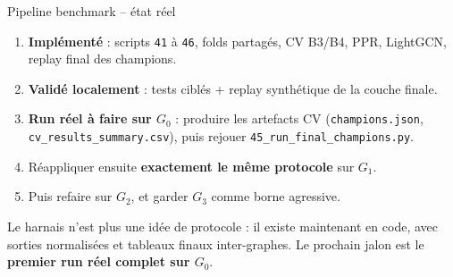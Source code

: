 \documentclass[aspectratio=169,10pt]{beamer}
\newcommand{\okbox}[1]{%
  \begin{center}
  \colorbox{green!10}{\parbox{0.92\linewidth}{\centering #1}}
  \end{center}}
\begin{document}
\begin{frame}{Pipeline benchmark -- état réel}
  \footnotesize
  \begin{enumerate}\setlength{\itemsep}{0.32em}
    \item \textbf{Implémenté} : scripts \texttt{41} à \texttt{46}, folds partagés, CV B3/B4, PPR, LightGCN, replay final des champions.
    \item \textbf{Validé localement} : tests ciblés + replay synthétique de la couche finale.
    \item \textbf{Run réel à faire sur $G_0$} : produire les artefacts CV (\texttt{champions.json}, \texttt{cv\_results\_summary.csv}), puis rejouer \texttt{45\_run\_final\_champions.py}.
    \item Réappliquer ensuite \textbf{exactement le même protocole} sur \textbf{$G_1$}.
    \item Puis refaire sur \textbf{$G_2$}, et garder \textbf{$G_3$} comme borne agressive.
  \end{enumerate}

  \vspace{0.5em}
  \okbox{\scriptsize Le harnais n'est plus une idée de protocole : il existe maintenant
  en code, avec sorties normalisées et tableaux finaux inter-graphes. Le prochain jalon
  est le \textbf{premier run réel complet sur $G_0$}.}
\end{frame}
\end{document}
